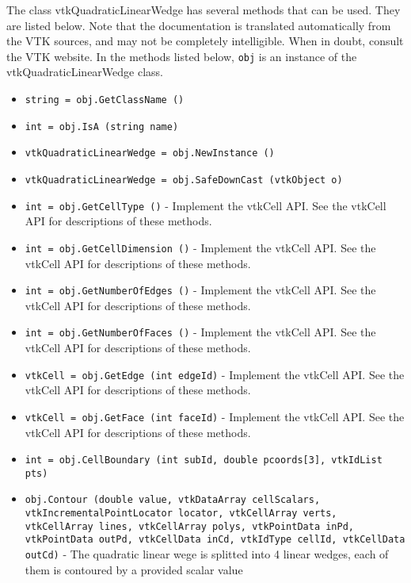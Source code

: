 The class vtkQuadraticLinearWedge has several methods that can be used.
  They are listed below.
Note that the documentation is translated automatically from the VTK sources,
and may not be completely intelligible.  When in doubt, consult the VTK website.
In the methods listed below, \verb|obj| is an instance of the vtkQuadraticLinearWedge class.
\begin{itemize}
\item  \verb|string = obj.GetClassName ()|

\item  \verb|int = obj.IsA (string name)|

\item  \verb|vtkQuadraticLinearWedge = obj.NewInstance ()|

\item  \verb|vtkQuadraticLinearWedge = obj.SafeDownCast (vtkObject o)|

\item  \verb|int = obj.GetCellType ()| -  Implement the vtkCell API. See the vtkCell API for descriptions
 of these methods.

\item  \verb|int = obj.GetCellDimension ()| -  Implement the vtkCell API. See the vtkCell API for descriptions
 of these methods.

\item  \verb|int = obj.GetNumberOfEdges ()| -  Implement the vtkCell API. See the vtkCell API for descriptions
 of these methods.

\item  \verb|int = obj.GetNumberOfFaces ()| -  Implement the vtkCell API. See the vtkCell API for descriptions
 of these methods.

\item  \verb|vtkCell = obj.GetEdge (int edgeId)| -  Implement the vtkCell API. See the vtkCell API for descriptions
 of these methods.

\item  \verb|vtkCell = obj.GetFace (int faceId)| -  Implement the vtkCell API. See the vtkCell API for descriptions
 of these methods.

\item  \verb|int = obj.CellBoundary (int subId, double pcoords[3], vtkIdList pts)|

\item  \verb|obj.Contour (double value, vtkDataArray cellScalars, vtkIncrementalPointLocator locator, vtkCellArray verts, vtkCellArray lines, vtkCellArray polys, vtkPointData inPd, vtkPointData outPd, vtkCellData inCd, vtkIdType cellId, vtkCellData outCd)| -  The quadratic linear wege is splitted into 4 linear wedges,
 each of them is contoured by a provided scalar value


\end{itemize}
